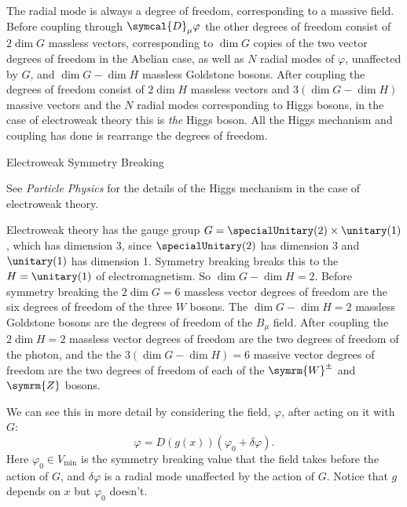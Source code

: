 \documentclass[fleqn]{NotesClass}
\newcommand{\course}[1]{\textit{#1}}
\newcommand{\Pparticle}[1]{\symrm{#1}}
\newcommand{\PWpm}{\ensuremath{\Pparticle{W}^{\pm}}}
\newcommand{\PZ}{\ensuremath{\Pparticle{Z}}}
\newcommand{\covariantDerivative}{\symcal{D}}
\begin{document}
    The radial mode is always a degree of freedom, corresponding to a massive field.
    Before coupling through \(\covariantDerivative_\mu \varphi\) the other degrees of freedom consist of \(2 \dim G\) massless vectors, corresponding to \(\dim G\) copies of the two vector degrees of freedom in the Abelian case, as well as \(N\) radial modes of \(\varphi\), unaffected by \(G\), and \(\dim G - \dim H\) massless Goldstone bosons.
    After coupling the degrees of freedom consist of \(2 \dim H\) massless vectors and \(3(\dim G - \dim H)\) massive vectors and the \(N\) radial modes corresponding to Higgs bosons, in the case of electroweak theory this is \emph{the} Higgs boson.
    All the Higgs mechanism and coupling has done is rearrange the degrees of freedom.
    
    \begin{exm}{Electroweak Symmetry Breaking}{}
        \begin{rmk}
            See \course{Particle Physics} for the details of the Higgs mechanism in the case of electroweak theory.
        \end{rmk}
        Electroweak theory has the gauge group \(G = \specialUnitary(2) \times \unitary(1)\), which has dimension \(3\), since \(\specialUnitary(2)\) has dimension 3 and \(\unitary(1)\) has dimension 1.
        Symmetry breaking breaks this to the \(H = \unitary(1)\) of electromagnetism.
        So \(\dim G - \dim H = 2\).
        Before symmetry breaking the \(2 \dim G = 6\) massless vector degrees of freedom are the six degrees of freedom of the three \(W\) bosons.
        The \(\dim G - \dim H = 2\) massless Goldstone bosons are the degrees of freedom of the \(B_\mu\) field.
        After coupling the \(2\dim H = 2\) massless vector degrees of freedom are the two degrees of freedom of the photon, and the the \(3(\dim G - \dim H) = 6\) massive vector degrees of freedom are the two degrees of freedom of each of the \(\PWpm\) and \(\PZ\) bosons.
    \end{exm}
    
    We can see this in more detail by considering the field, \(\varphi\), after acting on it with \(G\):
    \begin{equation}
        \varphi = D(g(x))(\varphi_0 + \delta \varphi).
    \end{equation}
    Here \(\varphi_0 \in V_{\min}\) is the symmetry breaking value that the field takes before the action of \(G\), and \(\delta \varphi\) is a radial mode unaffected by the action of \(G\).
    Notice that \(g\) depends on \(x\) but \(\varphi_0\) doesn't.
    
\end{document}
